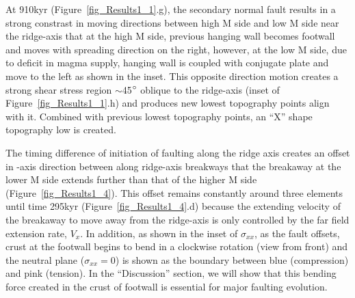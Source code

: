 At 910kyr (Figure~\ref{fig_Results1_1}.g), the secondary normal fault results in a strong constrast in moving directions between high M side and low M side near the ridge-axis that at the high M side, previous hanging wall becomes footwall and moves with spreading direction on the right, however, at the low M side, due to deficit in magma supply, hanging wall is coupled with conjugate plate and move to the left as shown in the inset. This opposite direction motion creates a strong shear stress region $\sim$45$\degree$ oblique to the ridge-axis (inset of Figure~\ref{fig_Results1_1}.h) and produces new lowest topography points align with it. Combined with previous lowest topography points, an ``X'' shape topography low is created.

The timing difference of initiation of faulting along the ridge axis creates an offset in -axis direction between along ridge-axis breakways that the breakaway at the lower M side extends further than that of the higher M side (Figure~\ref{fig_Results1_4}). This offset remains constantly around three elements until time 295kyr (Figure~\ref{fig_Results1_4}.d) because the extending velocity of the breakaway to move away from the ridge-axis is only controlled by the far field extension rate, $V_{x}$.  In addition, as shown in the inset of $\sigma_{xx}$, as the fault offsets, crust at the footwall begins to bend in a clockwise rotation (view from front) and the neutral plane ($\sigma_{xx}=0$) is shown as the boundary between blue (compression) and pink (tension). In the ``Discussion'' section, we will show that this bending force created in the crust of footwall is essential for major faulting evolution.

